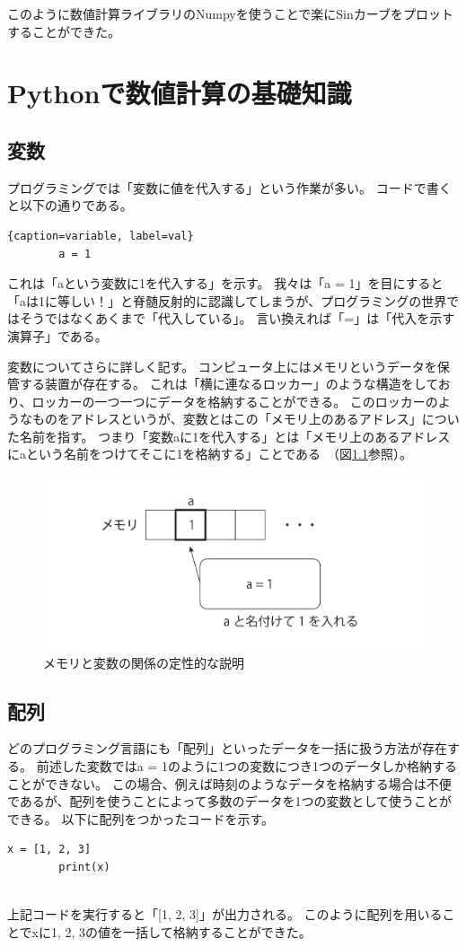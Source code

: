 \documentclass[]{ltjsbook}
\begin{document}
	このように数値計算ライブラリのNumpyを使うことで楽にSinカーブをプロットすることができた。

	\chapter{Pythonで数値計算の基礎知識}
	\section{変数}
	プログラミングでは「変数に値を代入する」という作業が多い。
	コードで書くと以下の通りである。
	\begin{lstlisting}{caption=variable, label=val}
		a = 1
	\end{lstlisting}
	これは「aという変数に1を代入する」を示す。
	我々は「a = 1」を目にすると「aは1に等しい！」と脊髄反射的に認識してしまうが、プログラミングの世界ではそうではなくあくまで「代入している」。
	言い換えれば「=」は「代入を示す演算子」である。

	変数についてさらに詳しく記す。
	コンピュータ上にはメモリというデータを保管する装置が存在する。
	これは「横に連なるロッカー」のような構造をしており、ロッカーの一つ一つにデータを格納することができる。
	このロッカーのようなものをアドレスというが、変数とはこの「メモリ上のあるアドレス」についた名前を指す。
	つまり「変数aに1を代入する」とは「メモリ上のあるアドレスにaという名前をつけてそこに1を格納する」ことである~（図\ref{fig:memory1}参照）。

	\begin{figure}
		\centering
		\includegraphics[width=0.8\linewidth]{figs/memory_explain1.pdf}
		\caption{メモリと変数の関係の定性的な説明}
		\label{fig:memory1}
	\end{figure}

	\section{配列}
	どのプログラミング言語にも「配列」といったデータを一括に扱う方法が存在する。
	前述した変数ではa = 1のように1つの変数につき1つのデータしか格納することができない。
	この場合、例えば時刻のようなデータを格納する場合は不便であるが、配列を使うことによって多数のデータを1つの変数として使うことができる。
	以下に配列をつかったコードを示す。
	\begin{lstlisting}[caption=array.py, label=array]
		x = [1, 2, 3]
		print(x)
	
	\end{lstlisting}
	上記コードを実行すると「[1, 2, 3]」が出力される。
	このように配列を用いることでxに1, 2, 3の値を一括して格納することができた。
\end{document}
